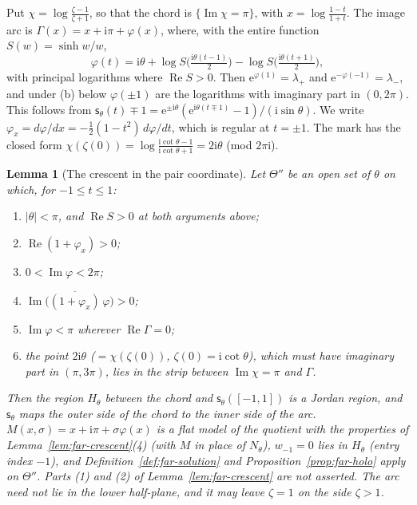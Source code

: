 \documentclass[11pt]{amsart}
\newtheorem{lemma}[theorem]{Lemma}
\theoremstyle{definition}
\newcommand{\eee}{\mathrm{e}}
\newcommand{\ii}{\mathrm{i}}
\begin{document}
Put $\chi=\log\frac{\zeta-1}{\zeta+1}$, so that the chord is $\{\operatorname{Im}\chi=\pi\}$, with $x=\log\frac{1-t}{1+t}$.  The
image arc is $\Gamma(x)=x+\ii\pi+\varphi(x)$, where, with the entire function $S(w)=\sinh w/w$,
\[
 \varphi(t)=\ii\theta+\log S\bigl(\tfrac{\ii\theta(t-1)}2\bigr)-\log S\bigl(\tfrac{\ii\theta(t+1)}2\bigr),
\]
with principal logarithms where $\operatorname{Re}S>0$.  Then $\eee^{\varphi(1)}=\lambda_+$ and $\eee^{-\varphi(-1)}=\lambda_-$, and under (b)
below $\varphi(\pm1)$ are the logarithms with imaginary part in $(0,2\pi)$.  This follows from $\mathsf s_\theta(t)\mp1=\eee^{\pm\ii\theta}(\eee^{\ii\theta(t\mp1)}-1)/(\ii\sin\theta)$.  We write
$\varphi_x=d\varphi/dx=-\tfrac12(1-t^2)\,d\varphi/dt$, which is regular at $t=\pm1$.  The mark has the
closed form $\chi(\zeta(0))=\log\frac{\ii\cot\theta-1}{\ii\cot\theta+1}=2\ii\theta$ (mod $2\pi\ii$).

\begin{lemma}[The crescent in the pair coordinate]\label{lem:chi-crescent}
Let $\Theta''$ be an open set of $\theta$ on which, for $-1\le t\le1$:
\begin{enumerate}
\item[(f)] $|\theta|<\pi$, and $\operatorname{Re}S>0$ at both arguments above;
\item[(a)] $\operatorname{Re}(1+\varphi_x)>0$;
\item[(b)] $0<\operatorname{Im}\varphi<2\pi$;
\item[(c)] $\operatorname{Im}\bigl(\overline{(1+\varphi_x)}\,\varphi\bigr)>0$;
\item[(d)] $\operatorname{Im}\varphi<\pi$ wherever $\operatorname{Re}\Gamma=0$;
\item[(e)] the point $2\ii\theta$ ($=\chi(\zeta(0))$, $\zeta(0)=\ii\cot\theta$), which must have imaginary part in
  $(\pi,3\pi)$, lies in the strip between $\operatorname{Im}\chi=\pi$ and $\Gamma$.
\end{enumerate}
Then the region $H_\theta$ between the chord and $\mathsf s_\theta([-1,1])$ is a Jordan region, and
$\mathsf s_\theta$ maps the outer side of the chord to the inner side of the arc.
$M(x,\sigma)=x+\ii\pi+\sigma\varphi(x)$ is a flat model of the quotient with the properties of
Lemma~\ref{lem:far-crescent}(4) (with $M$ in place of $N_\theta$), $w_{-1}=0$ lies in $H_\theta$ (entry
index $-1$), and Definition~\ref{def:far-solution} and Proposition~\ref{prop:far-holo}
apply on $\Theta''$.  Parts (1) and (2) of Lemma~\ref{lem:far-crescent} are not asserted.  The
arc need not lie in the lower half-plane, and it may leave $\zeta=1$ on the side $\zeta>1$.
\end{lemma}
\end{document}
